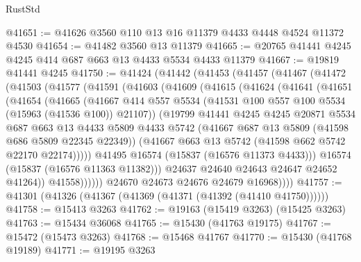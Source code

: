 \begin{lexlean}{RustStd}
\begin{coremodule}
{\begin{coremodule}
{{{{{{{{{{{{{{{{{{{{{{{{{{{{{{{{{{{{{{{{{{{{{{{{{{{{{{{{{{{{@41651 := @41626 @3560 @110 @13 @16 @11379 @4433 @4448 @4524 @11372 @4530
@41654 := @41482 @3560 @13 @11379
@41665 := @20765 @41441 @4245 @4245 @414 @687 @663 @13 @4433 @5534 @4433 @11379
@41667 := @19819 @41441 @4245
@41750 := @41424
    (@41442
      (@41453
        (@41457
          (@41467
            (@41472
              (@41503
                (@41577
                  (@41591
                    (@41603
                      (@41609
                        (@41615
                          (@41624
                            (@41641
                              (@41651
                                (@41654
                                  (@41665
                                    (@41667
                                      @414
                                      @557
                                      @5534
                                      (@41531 @100 @557 @100 @5534 (@15963 (@41536 @100)) @21107))
                                    (@19799
                                      @41441
                                      @4245
                                      @4245
                                      @20871
                                      @5534
                                      @687
                                      @663
                                      @13
                                      @4433
                                      @5809
                                      @4433
                                      @5742
                                      (@41667 @687 @13 @5809 (@41598 @686 @5809 @22345 @22349))
                                      (@41667 @663 @13 @5742 (@41598 @662 @5742 @22170 @22174)))))
                                @41495
                                @16574
                                (@15837 (@16576 @11373 @4433)))
                              @16574
                              (@15837 (@16576 @11363 @11382)))
                            @24637
                            @24640
                            @24643
                            @24647
                            @24652
                            @41264))
                        @41558))))))
            @24670
            @24673
            @24676
            @24679
            @16968))))
@41757 := @41301 (@41326 (@41367 (@41369 (@41371 (@41392 (@41410 @41750))))))
@41758 := @15413 @3263
@41762 := @19163 (@15419 @3263) (@15425 @3263)
@41763 := @15434 @36068
@41765 := @15430 (@41763 @19175)
@41767 := @15472 (@15473 @3263)
@41768 := @15468 @41767
@41770 := @15430 (@41768 @19189)
@41771 := @19195 @3263
}}}}}}}}}}}}}}}}}}}}}}}}}}}}}}}}}}}}}}}}}}}}}}}}}}}}}}}}}}}}
\end{coremodule}}
\end{coremodule}
\end{lexlean}
